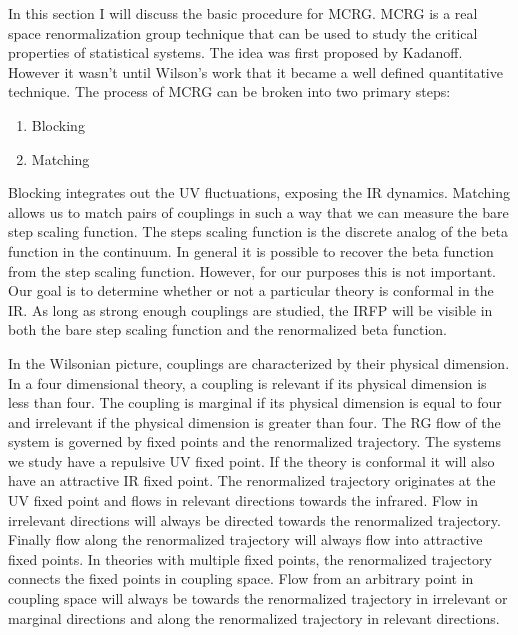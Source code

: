 
In this section I will discuss the basic procedure for MCRG.
MCRG is a real space renormalization group technique that can be used to study the critical properties of statistical systems.
The idea was first proposed by Kadanoff. 
However it wasn't until Wilson's work that it became a well defined quantitative technique.
The process of MCRG can be broken into two primary steps:
\begin{enumerate}
  \item Blocking
  \item Matching
\end{enumerate}
Blocking integrates out the UV fluctuations, exposing the IR dynamics.
Matching allows us to match pairs of couplings in such a way that we can measure the bare step scaling function.
The steps scaling function is the discrete analog of the beta function in the continuum.
In general it is possible to recover the beta function from the step scaling function.
However, for our purposes this is not important.
Our goal is to determine whether or not a particular theory is conformal in the IR.
As long as strong enough couplings are studied, the IRFP will be visible in both the bare step scaling function and the renormalized beta function.

In the Wilsonian picture, couplings are characterized by their physical dimension.
In a four dimensional theory, a coupling is relevant if its physical dimension is less than four.
The coupling is marginal if its physical dimension is equal to four and irrelevant if the physical dimension is greater than four.
The RG flow of the system is governed by fixed points and the renormalized trajectory.
The systems we study have a repulsive UV fixed point.
If the theory is conformal it will also have an attractive IR fixed point.
The renormalized trajectory originates at the UV fixed point and flows in relevant directions towards the infrared.
Flow in irrelevant directions will always be directed towards the renormalized trajectory.
Finally flow along the renormalized trajectory will always flow into attractive fixed points.
In theories with multiple fixed points, the renormalized trajectory connects the fixed points in coupling space.
Flow from an arbitrary point in coupling space will always be towards the renormalized trajectory in irrelevant or marginal directions and along the renormalized trajectory in relevant directions.

